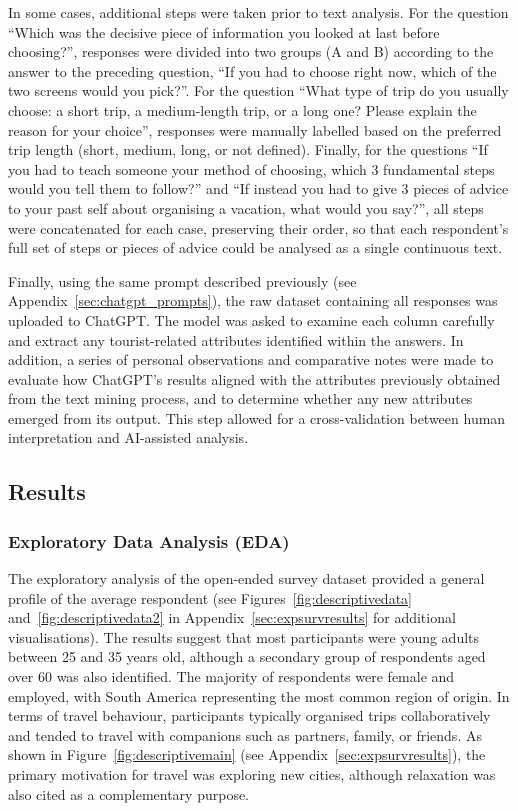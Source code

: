 \documentclass[a4paper, 12pt, twoside]{report}  %
\begin{document}
\indent In some cases, additional steps were taken prior to text analysis. For the question “Which was the decisive piece of information you looked at last before choosing?”, responses were divided into two groups (A and B) according to the answer to the preceding question, “If you had to choose right now, which of the two screens would you pick?”. For the question “What type of trip do you usually choose: a short trip, a medium-length trip, or a long one? Please explain the reason for your choice”, responses were manually labelled based on the preferred trip length (short, medium, long, or not defined). Finally, for the questions “If you had to teach someone your method of choosing, which 3 fundamental steps would you tell them to follow?” and “If instead you had to give 3 pieces of advice to your past self about organising a vacation, what would you say?”, all steps were concatenated for each case, preserving their order, so that each respondent’s full set of steps or pieces of advice could be analysed as a single continuous text.

\indent Finally, using the same prompt described previously (see Appendix~\ref{sec:chatgpt_prompts}), the raw dataset containing all responses was uploaded to ChatGPT. The model was asked to examine each column carefully and extract any tourist-related attributes identified within the answers. In addition, a series of personal observations and comparative notes were made to evaluate how ChatGPT’s results aligned with the attributes previously obtained from the text mining process, and to determine whether any new attributes emerged from its output. This step allowed for a cross-validation between human interpretation and AI-assisted analysis.

\subsection{Results}

\subsubsection{Exploratory Data Analysis (EDA)}

\indent The exploratory analysis of the open-ended survey dataset provided a general profile of the average respondent (see Figures~\ref{fig:descriptivedata} and~\ref{fig:descriptivedata2} in Appendix~\ref{sec:expsurvresults} for additional visualisations). The results suggest that most participants were young adults between 25 and 35 years old, although a secondary group of respondents aged over 60 was also identified. The majority of respondents were female and employed, with South America representing the most common region of origin. In terms of travel behaviour, participants typically organised trips collaboratively and tended to travel with companions such as partners, family, or friends. As shown in Figure~\ref{fig:descriptivemain} (see Appendix~\ref{sec:expsurvresults}), the primary motivation for travel was exploring new cities, although relaxation was also cited as a complementary purpose.
\end{document}
